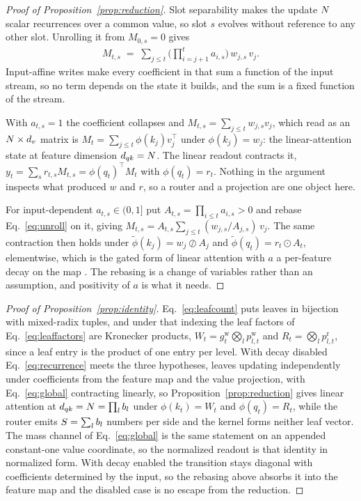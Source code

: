 \begin{proof}[Proof of Proposition~\ref{prop:reduction}]
Slot separability makes the update $N$ scalar recurrences over a common value, so slot $s$ evolves without reference to any other slot. Unrolling it from $M_{0,s} = 0$ gives
\begin{align}
  M_{t,s} \;=\; \sum_{j \le t} \Big( \prod_{i=j+1}^{t} a_{i,s} \Big)\, w_{j,s}\, v_j .
  \label{eq:unroll}
\end{align}
Input-affine writes make every coefficient in that sum a function of the input stream, so no term depends on the state it builds, and the sum is a fixed function of the stream.

With $a_{t,s} = 1$ the coefficient collapses and $M_{t,s} = \sum_{j\le t} w_{j,s} v_j$, which read as an $N \times d_v$ matrix is $M_t = \sum_{j \le t} \phi(k_j) v_j^\top$ under $\phi(k_j) = w_j$: the linear-attention state at feature dimension $d_{qk} = N$. The linear readout contracts it, $y_t = \sum_s r_{t,s} M_{t,s} = \phi(q_t)^\top M_t$ with $\phi(q_t) = r_t$. Nothing in the argument inspects what produced $w$ and $r$, so a router and a projection are one object here.

For input-dependent $a_{t,s} \in (0,1]$ put $A_{t,s} = \prod_{i \le t} a_{i,s} > 0$ and rebase Eq.~\eqref{eq:unroll} on it, giving $M_{t,s} = A_{t,s} \sum_{j\le t} (w_{j,s}/A_{j,s})\, v_j$. The same contraction then holds under $\tilde\phi(k_j) = w_j \oslash A_j$ and $\tilde\phi(q_t) = r_t \odot A_t$, elementwise, which is the gated form of linear attention with $a$ a per-feature decay on the map \citep{yang2024gla}. The rebasing is a change of variables rather than an assumption, and positivity of $a$ is what it needs.
\end{proof}

\begin{proof}[Proof of Proposition~\ref{prop:identity}]
Eq.~\eqref{eq:leafcount} puts leaves in bijection with mixed-radix tuples, and under that indexing the leaf factors of Eq.~\eqref{eq:leaffactors} are Kronecker products, $W_t = g^{\mathrm{w}}_t \bigotimes_l p^{\mathrm{w}}_{l,t}$ and $R_t = \bigotimes_l p^{\mathrm{r}}_{l,t}$, since a leaf entry is the product of one entry per level. With decay disabled Eq.~\eqref{eq:recurrence} meets the three hypotheses, leaves updating independently under coefficients from the feature map and the value projection, with Eq.~\eqref{eq:global} contracting linearly, so Proposition~\ref{prop:reduction} gives linear attention at $d_{qk} = N = \prod_l b_l$ under $\phi(k_t) = W_t$ and $\phi(q_t) = R_t$, while the router emits $S = \sum_l b_l$ numbers per side and the kernel forms neither leaf vector. The mass channel of Eq.~\eqref{eq:global} is the same statement on an appended constant-one value coordinate, so the normalized readout is that identity in normalized form. With decay enabled the transition stays diagonal with coefficients determined by the input, so the rebasing above absorbs it into the feature map and the disabled case is no escape from the reduction.
\end{proof}

